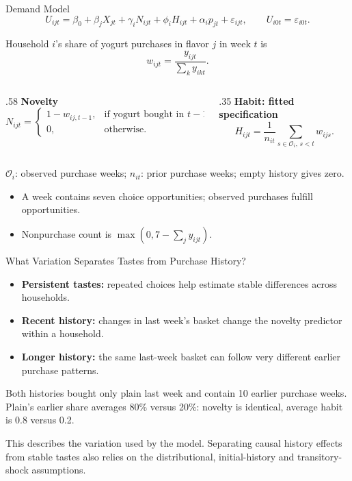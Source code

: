 \documentclass[aspectratio=169,professionalfonts]{beamer}
\newcommand{\shortbuttons}{}
\begin{document}
\gdef\shortbuttons{\hyperlink{short-average-history}{\beamergotobutton{Average-history specification}}}
\begin{frame}[label=short-27]{Demand Model}
  \small
  \[
    U_{ijt}=\beta_0+\beta_jX_{jt}+\gamma_iN_{ijt}+\phi_iH_{ijt}
             +\alpha_i p_{jt}+\varepsilon_{ijt},
    \qquad U_{i0t}=\varepsilon_{i0t}.
  \]

  Household $i$'s share of yogurt purchases in flavor $j$ in week $t$ is
  \[
    w_{ijt}=\frac{y_{ijt}}{\sum_k y_{ikt}}.
  \]

  \begin{columns}[T,onlytextwidth]
    \begin{column}{.58\textwidth}
      \textbf{Novelty}
      \[
        N_{ijt}=\begin{cases}
          1-w_{ij,t-1}, & \text{if yogurt bought in $t-1$},\\
          0, & \text{otherwise}.
        \end{cases}
      \]
    \end{column}
    \begin{column}{.35\textwidth}
      \textbf{Habit: fitted specification}
      \[
        H_{ijt}=\frac{1}{n_{it}}\sum_{s\in\mathcal{O}_i,\,s<t}w_{ijs}.
      \]
    \end{column}
  \end{columns}
  {\footnotesize $\mathcal{O}_i$: observed purchase weeks; $n_{it}$: prior purchase weeks; empty history gives zero.}
  \begin{itemize}
    \item A week contains seven choice opportunities; observed purchases fulfill opportunities.
    \item Nonpurchase count is $\max(0,7-\sum_j y_{ijt})$.
  \end{itemize}
\end{frame}

\gdef\shortbuttons{}
\begin{frame}[label=short-identification]{What Variation Separates Tastes from Purchase History?}
  \begin{itemize}
    \item \textbf{Persistent tastes:} repeated choices help estimate stable
    differences across households.
    \item \textbf{Recent history:} changes in last week's basket change the
    novelty predictor within a household.
    \item \textbf{Longer history:} the same last-week basket can follow very
    different earlier purchase patterns.
  \end{itemize}
  \begin{tcolorbox}
    Both histories bought only plain last week and contain 10 earlier purchase weeks.
    Plain's earlier share averages 80\% versus 20\%: novelty is identical,
    average habit is 0.8 versus 0.2.
  \end{tcolorbox}
  \par\smallskip\footnotesize This describes the variation used by the model.
  Separating causal history effects from stable tastes also relies on the
  distributional, initial-history and transitory-shock assumptions.
\end{frame}
\end{document}
